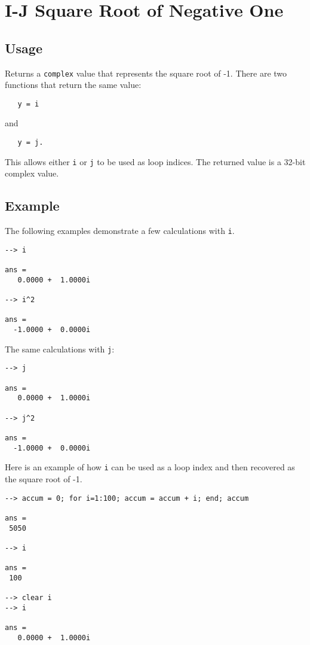 \section{I-J Square Root of Negative One}

\subsection{Usage}

Returns a \verb|complex| value that represents the square root of -1.  There are two
functions that return the same value:
\begin{verbatim}
   y = i
\end{verbatim}
and 
\begin{verbatim}
   y = j.
\end{verbatim}
This allows either \verb|i| or \verb|j| to be used as loop indices.  The returned value is a 32-bit complex value.
\subsection{Example}

The following examples demonstrate a few calculations with \verb|i|.
\begin{verbatim}
--> i

ans = 
   0.0000 +  1.0000i 

--> i^2

ans = 
  -1.0000 +  0.0000i 
\end{verbatim}
The same calculations with \verb|j|:
\begin{verbatim}
--> j

ans = 
   0.0000 +  1.0000i 

--> j^2

ans = 
  -1.0000 +  0.0000i 
\end{verbatim}
Here is an example of how \verb|i| can be used as a loop index and then recovered as the square root of -1.
\begin{verbatim}
--> accum = 0; for i=1:100; accum = accum + i; end; accum

ans = 
 5050 

--> i

ans = 
 100 

--> clear i
--> i

ans = 
   0.0000 +  1.0000i 
\end{verbatim}
